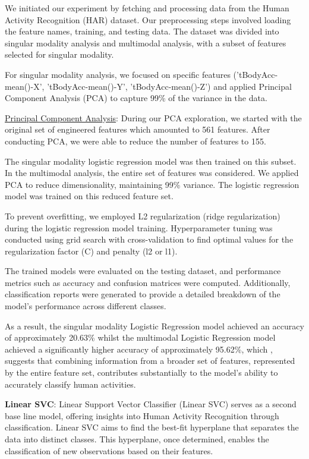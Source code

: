 \documentclass[conference]{IEEEtran}
\begin{document}
We initiated our experiment by fetching and processing data from the Human Activity Recognition (HAR) dataset. Our preprocessing steps involved loading the feature names, training, and testing data. The dataset was divided into singular modality analysis and multimodal analysis, with a subset of features selected for singular modality.

For singular modality analysis, we focused on specific features ('tBodyAcc-mean()-X', 'tBodyAcc-mean()-Y', 'tBodyAcc-mean()-Z') and applied Principal Component Analysis (PCA) to capture 99\% of the variance in the data. \newline 

\underline{Principal Component Analysis}: During our PCA exploration, we started with the original set of engineered features which amounted to 561 features. After conducting PCA, we were able to reduce the number of features to 155. 


The singular modality logistic regression model was then trained on this subset. In the multimodal analysis, the entire set of features was considered. We applied PCA to reduce dimensionality, maintaining 99\% variance. The logistic regression model was trained on this reduced feature set.

To prevent overfitting, we employed L2 regularization (ridge regularization) during the logistic regression model training. Hyperparameter tuning was conducted using grid search with cross-validation to find optimal values for the regularization factor (C) and penalty (l2 or l1).

The trained models were evaluated on the testing dataset, and performance metrics such as accuracy and confusion matrices were computed. Additionally, classification reports were generated to provide a detailed breakdown of the model's performance across different classes.

As a result, the singular modality Logistic Regression model achieved an accuracy of approximately 20.63\% whilst the multimodal Logistic Regression model achieved a significantly higher accuracy of approximately 95.62\%, which , suggests that combining information from a broader set of features, represented by the entire feature set, contributes substantially to the model's ability to accurately classify human activities.


\textbf{Linear SVC}: 
Linear Support Vector Classifier (Linear SVC) serves as a second base line model, offering insights into Human Activity Recognition through classification. Linear SVC aims to find the best-fit hyperplane that separates the data into distinct classes. This hyperplane, once determined, enables the classification of new observations based on their features.
\end{document}
